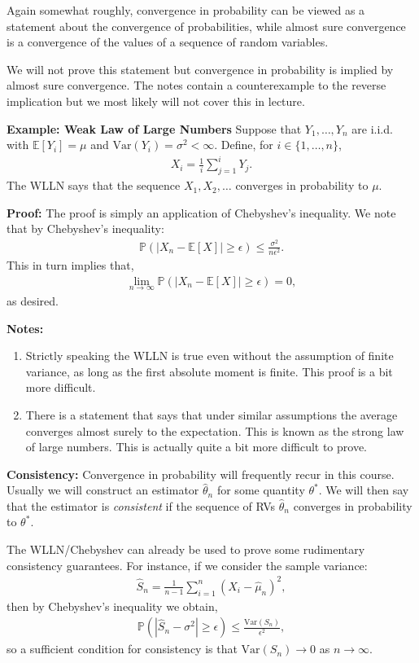 \documentclass[twoside,12pt]{article}
\begin{document}
Again somewhat roughly, convergence in probability can be viewed as a statement about the convergence of probabilities, while almost sure convergence is a convergence of the values of a sequence of random variables.

We will not prove this statement but convergence in probability is implied by almost sure convergence. The notes contain a counterexample to the reverse implication but we most likely will not cover this in lecture.

{\bf Example: Weak Law of Large Numbers} Suppose that $Y_1,\ldots,Y_n$ are i.i.d. with $\mathbb{E}[Y_i] = \mu$ and $\text{Var}(Y_i) = \sigma^2 < \infty$. Define, for $i \in \{1,\ldots,n\}$,
\begin{align*}
X_i = \frac{1}{i} \sum_{j = 1}^i Y_j.
\end{align*}
The WLLN says that the sequence $X_1,X_2,\ldots$ converges in probability to $\mu$.

{\bf Proof: } The proof is simply an application of Chebyshev's inequality. We note that by Chebyshev's inequality: 
\begin{align*}
\mathbb{P}(|X_n - \mathbb{E}[X]| \geq \epsilon) \leq \frac{\sigma^2}{n \epsilon^2}.
\end{align*}
This in turn implies that,
\begin{align*}
\lim_{n \rightarrow \infty} \mathbb{P}(|X_n - \mathbb{E}[X]| \geq \epsilon) = 0,
\end{align*}
as desired.

{\bf Notes: } 
\begin{enumerate}
\item Strictly speaking the WLLN is true even without the assumption of finite variance, as long as the first absolute moment is finite. This proof is a bit more difficult.
\item There is a statement that says that under similar assumptions the average converges almost surely to the expectation. This is known as the strong law of large numbers. This is actually quite a bit more difficult to prove.
\end{enumerate}

{\bf Consistency: } Convergence in probability will frequently recur in this course. Usually we will construct an estimator $\widehat{\theta}_n$ for some quantity $\theta^*$. We will then say that the estimator is \emph{consistent} if the sequence of RVs $\widehat{\theta}_n$ converges in probability to $\theta^*$.

The WLLN/Chebyshev can already be used to prove some rudimentary consistency guarantees. For instance, if we consider the sample variance:
\begin{align*}
\widehat{S}_n = \frac{1}{n - 1} \sum_{i=1}^n (X_i - \widehat{\mu}_n)^2,
\end{align*}
then by Chebyshev's inequality we obtain,
\begin{align*}
\mathbb{P}(|\widehat{S}_n - \sigma^2| \geq \epsilon) \leq \frac{\text{Var}(S_n)}{\epsilon^2},
\end{align*}
so a sufficient condition for consistency is that $\text{Var}(S_n) \rightarrow 0$ as $n \rightarrow \infty$.
\end{document}
